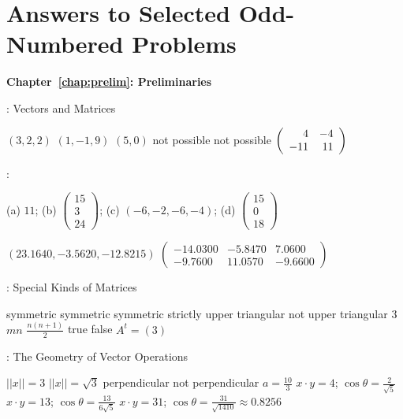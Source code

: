 \chapter*{Answers to Selected Odd-Numbered Problems}


\small

{\bf Chapter~\ref{chap:prelim}: Preliminaries}

: Vectors and Matrices

 $(3,2,2)$
 $(1,-1,9)$
 $(5,0)$
 not possible
 not possible
 $\left(\begin{array}{rr} 4 & -4\\ -11 &11\end{array}\right)$


: \Matlab

(a) $11$;
(b) $\left(\begin{array}{r} 15\\ 3 \\24\end{array} \right)$;
(c) $(-6,-2,-6,-4)$;
(d) $\left(\begin{array}{r} 15 \\ 0 \\ 18 \end{array} \right)$

  $(23.1640, -3.5620, -12.8215)$
  $\left(\begin{array}{rrr} 
-14.0300 & -5.8470 &    7.0600 \\
 -9.7600 & 11.0570 &   -9.6600\end{array}\right)$

: Special Kinds of Matrices

 symmetric
 symmetric
 symmetric
 strictly upper triangular
 not upper triangular
 $3$
 $mn$
 $\frac{n(n + 1)}{2}$
 true
 false
 \ans $A^t = (3)$

: The Geometry of Vector Operations

 \ans $||x|| = 3$
 \ans $||x||=\sqrt{3}$
 \ans perpendicular
 \ans not perpendicular
 $a = \frac{10}{3}$
 \ans $x \cdot y = 4$; $\cos\theta =\frac{2}{\sqrt{5}}$
 \ans $x \cdot y = 13$; $\cos\theta=\frac{13}{6\sqrt{5}}$
 \ans $x \cdot y = 31$; $\cos\theta=\frac{31}{\sqrt{1410}} 
\approx 0.8256$

